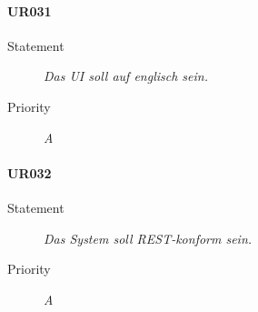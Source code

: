 \paragraph{UR031}
\begin{description}
\item[Statement] \textit{Das \gls{UI} soll auf englisch sein.}
\item[Priority] \textit{A}
\end{description}

\paragraph{UR032}
\begin{description}
\item[Statement] \textit{Das System soll \gls{REST}-konform sein.}
\item[Priority] \textit{A}
\end{description}


